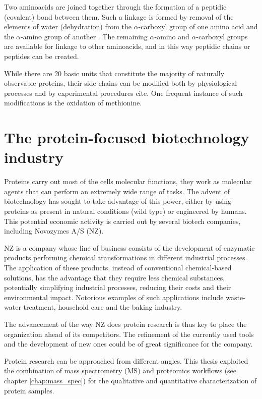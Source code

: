 \documentclass[11pt, a4paper]{report}
\begin{document}
Two aminoacids are joined together through the formation of a peptidic (covalent) bond between them. Such a linkage is formed by removal of the elements of water (dehydration) from the $\alpha$-carboxyl group of one amino acid and the $\alpha$-amino group of another \cite{Nelson2008}. The remaining $\alpha$-amino and $\alpha$-carboxyl groups are available for linkage to other aminoacids, and in this way peptidic chains or peptides can be created.

While there are 20 basic units that constitute the majority of naturally observable proteins, their side chains can be modified both by physiological processes and by experimental procedures cite. One frequent instance of such modifications is the oxidation of methionine.


\section{The protein-focused biotechnology industry}


Proteins carry out most of the cell\textquotesingle s molecular functions, they work as molecular agents that can perform an extremely wide range of tasks. The advent of biotechnology has sought to take advantage of this power, either by using proteins as present in natural conditions (wild type) or engineered by humans. This potential economic activity is carried out by several biotech companies, including Novozymes A/S (NZ).

\ac{NZ} is a company whose line of business consists of the development of enzymatic products performing chemical transformations in different industrial processes. The application of these products, instead of conventional chemical-based solutions, has the advantage that they require less chemical substances, potentially simplifying industrial processes, reducing their costs and their environmental impact. Notorious examples of such applications include waste-water treatment, household care and the baking industry.


The advancement of the way \ac{NZ} does protein research is thus key to place the organization ahead of its competitors. The refinement of the currently used tools and the development of new ones could be of great significance for the company. 

Protein research can be approached from different angles. This thesis exploited the combination of mass spectrometry (\ac{MS}) and proteomics workflows (see chapter \ref{chap:mass_spec}) for the qualitative and quantitative characterization of protein samples.
\end{document}
